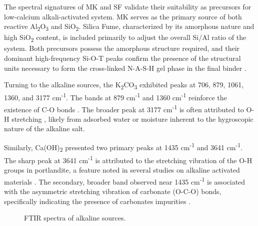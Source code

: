 The spectral signatures of MK and SF validate their suitability as precursors for low-calcium alkali-activated system. MK serves as the primary source of both reactive Al\textsubscript{2}O\textsubscript{3} and SiO\textsubscript{2}.
Silica Fume, characterized by its amorphous nature and high SiO\textsubscript{2} content, is included primarily to adjust the overall Si/Al ratio of the system.
Both precursors possess the amorphous structure required, and their dominant high-frequency Si-O-T peaks confirm the presence of the structural units necessary to form the cross-linked N-A-S-H gel phase in the final binder \cite{Provis2014_LowCa}.

 Turning to the alkaline sources, the K\textsubscript{2}CO\textsubscript{3} exhibited peaks at 706, 879, 1061, 1360, and 3177 cm\textsuperscript{-1}.
 The bands at 879 cm\textsuperscript{-1} and 1360 cm\textsuperscript{-1} reinforce the existence of C-O bonds \cite{moraes2024scsa}.
 The broader peak at 3177 cm\textsuperscript{-1} is often attributed to O-H stretching \cite{Brito2008}, likely from adsorbed water or moisture inherent to the hygroscopic nature of the alkaline salt.
 
 Similarly, Ca(OH)\textsubscript{2} presented two primary peaks at 1435 cm\textsuperscript{-1} and 3641 cm\textsuperscript{-1}.
 The sharp peak at 3641 cm\textsuperscript{-1} is attributed to the stretching vibration of the O-H groups in portlandite, a feature noted in several studies on alkaline activated materials \cite{batista2025mgosio2}.
 The secondary, broader band observed near 1435 cm\textsuperscript{-1} is associated with the asymmetric stretching vibration of carbonate (O-C-O) bonds, specifically indicating the presence of carbonates impurities \cite{Zhao2023}.
 
 \begin{figure}[H]
     \centering
     \caption{FTIR spectra of alkaline sources.}
     \label{fig:ftir_alkaline_sources}
 \end{figure}

